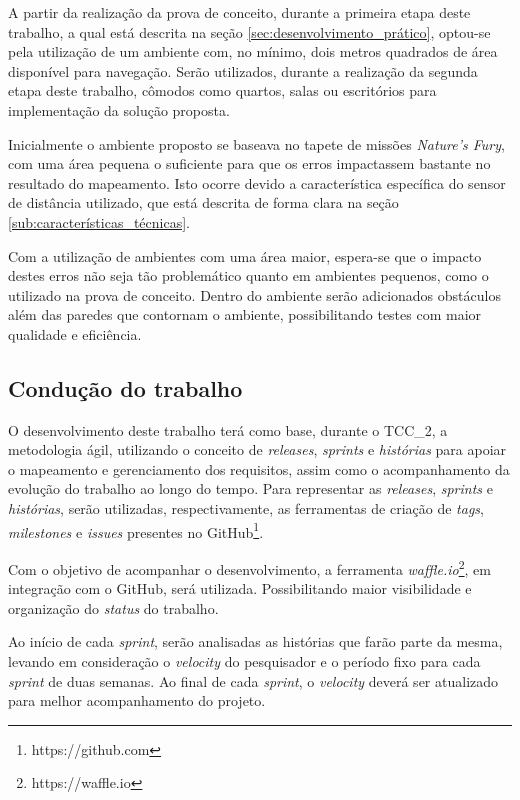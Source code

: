 		A partir da realização da prova de conceito, durante a primeira etapa deste trabalho, a qual está descrita na seção \ref{sec:desenvolvimento_prático}, optou-se pela utilização de um ambiente com, no mínimo, dois metros quadrados de área disponível para navegação. Serão utilizados, durante a realização da segunda etapa deste trabalho, cômodos como quartos, salas ou escritórios para implementação da solução proposta.

		Inicialmente o ambiente proposto se baseava no tapete de missões \textit{Nature's Fury}, com uma área pequena o suficiente para que os erros impactassem bastante no resultado do mapeamento. Isto ocorre devido a característica específica do sensor de distância utilizado, que está descrita de forma clara na seção \ref{sub:características_técnicas}.

		Com a utilização de ambientes com uma área maior, espera-se que o impacto destes erros não seja tão problemático quanto em ambientes pequenos, como o utilizado na prova de conceito. Dentro do ambiente serão adicionados obstáculos além das paredes que contornam o ambiente, possibilitando testes com maior qualidade e eficiência.



	\subsection{Condução do trabalho} %
	\label{sub:condução_do_trabalho}

		O desenvolvimento deste trabalho terá como base, durante o TCC\_2, a metodologia ágil, utilizando o conceito de \textit{releases}, \textit{sprints} e \textit{histórias} para apoiar o mapeamento e gerenciamento dos requisitos, assim como o acompanhamento da evolução do trabalho ao longo do tempo. Para representar as \textit{releases}, \textit{sprints} e \textit{histórias}, serão utilizadas, respectivamente, as ferramentas de criação de \textit{tags}, \textit{milestones} e \textit{issues} presentes no GitHub\footnote{https://github.com}.

		Com o objetivo de acompanhar o desenvolvimento, a ferramenta \textit{waffle.io}\footnote{https://waffle.io}, em integração com o GitHub, será utilizada. Possibilitando maior visibilidade e organização do \textit{status} do trabalho.

		Ao início de cada \textit{sprint}, serão analisadas as histórias que farão parte da mesma, levando em consideração o \textit{velocity} do pesquisador e o período fixo para cada \textit{sprint} de duas semanas. Ao final de cada \textit{sprint}, o \textit{velocity} deverá ser atualizado para melhor acompanhamento do projeto.

